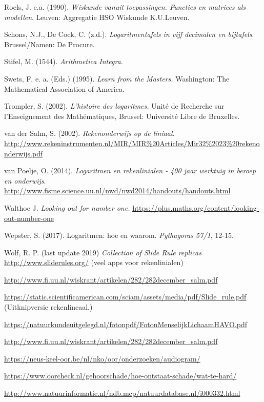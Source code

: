 \begin{bronnen}
\item Roels, J. e.a. (1990). \emph{Wiskunde vanuit toepassingen. Functies en matrices als modellen}. Leuven: Aggregatie HSO Wiskunde K.U.Leuven.

\item Schons, N.J., De Cock, C. (z.d.). \emph{Logaritmentafels in vijf decimalen en bijtafels}. Brussel/Namen: De Procure.

\item Stifel, M. (1544). \emph{Arithmetica Integra}. 

\item Swets, F. e. a. (Eds.) (1995). \emph{Learn from the Masters.} Washington: The Mathematical Association of America.

\item Trompler, S. (2002). \emph{ L'histoire des logaritmes.} Unité de Recherche sur l’Enseignement des Mathématiques, Brussel: Université Libre de Bruxelles.

\item van der Salm, S. (2002). \emph{Rekenonderwijs op de liniaal.} \url{http://www.rekeninstrumenten.nl/MIR/MIR%20Articles/Mir32%2023%20rekenonderwijs.pdf}

\item van Poelje, O. (2014). \emph{Logaritmen en rekenlinialen - 400 jaar werktuig in beroep en onderwijs}.\\ \url{http://www.fisme.science.uu.nl/nwd/nwd2014/handouts/handouts.html}

\item Walthoe J. \emph{Looking out for number one.}
\url{https://plus.maths.org/content/looking-out-number-one}

\item Wepster, S. (2017). Logaritmen: hoe en waarom. \emph{Pythagoras 57/1}, 12-15.

\item Wolf, R. P. (last update 2019) \emph{Collection of Slide Rule replicas} \url{http://www.sliderules.org/} (veel apps voor rekenlinialen)

\item \url{http://www.fi.uu.nl/wiskrant/artikelen/282/282december_salm.pdf} 

\item \url{https://static.scientificamerican.com/sciam/assets/media/pdf/Slide_rule.pdf} (Uitknipversie rekenlineaal.)

\item \url{https://natuurkundeuitgelegd.nl/fotonpdf/FotonMenselijkLichaamHAVO.pdf}

\item \url{http://www.fi.uu.nl/wiskrant/artikelen/282/282december_salm.pdf} 

\item \url{https://neus-keel-oor.be/nl/nko/oor/onderzoeken/audiogram/}

\item \url{https://www.oorcheck.nl/gehoorschade/hoe-ontstaat-schade/wat-te-hard/} 

\item \url{http://www.natuurinformatie.nl/ndb.mcp/natuurdatabase.nl/i000332.html}

\end{bronnen}


